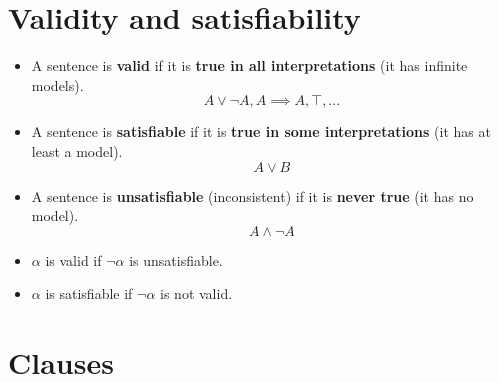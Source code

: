 \documentclass{article}
\begin{document}
\hspace{1cm}

\section*{Validity and satisfiability}

\begin{itemize}
    \item A sentence is \textbf{valid} if it is \textbf{true in all interpretations} (it has infinite models).
    \begin{equation*}
        A \lor \neg A, A \implies A, \top, ...
    \end{equation*}
    \item A sentence is \textbf{satisfiable} if it is \textbf{true in some interpretations} (it has at least a model).
    \begin{equation*}
        A \lor B
    \end{equation*}
    \item A sentence is \textbf{unsatisfiable} (inconsistent) if it is \textbf{never true} (it has no model).
    \begin{equation*}
        A \land \neg A        
    \end{equation*}
    \item $\alpha$ is valid if $\neg \alpha$ is unsatisfiable.
    \item $\alpha$ is satisfiable if $\neg \alpha$ is not valid.
\end{itemize}

\newpage

\section{Clauses}
\end{document}
